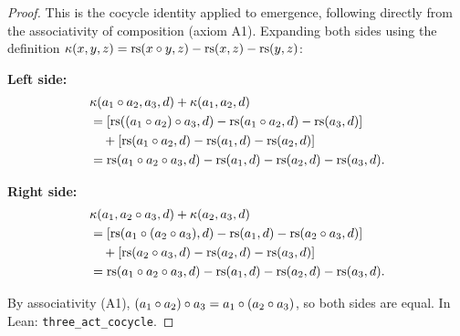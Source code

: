 \begin{proof}
This is the cocycle identity applied to emergence, following directly from the associativity of composition (axiom A1).  Expanding both sides using the definition $\kappa(x, y, z) = \mathrm{rs}(x \circ y, z) - \mathrm{rs}(x, z) - \mathrm{rs}(y, z)$:

\textbf{Left side:}
\begin{align*}
  &\kappa(a_1 \circ a_2, a_3, d) + \kappa(a_1, a_2, d) \\
  &= [\mathrm{rs}((a_1 \circ a_2) \circ a_3, d) - \mathrm{rs}(a_1 \circ a_2, d) - \mathrm{rs}(a_3, d)] \\
  &\quad + [\mathrm{rs}(a_1 \circ a_2, d) - \mathrm{rs}(a_1, d) - \mathrm{rs}(a_2, d)] \\
  &= \mathrm{rs}(a_1 \circ a_2 \circ a_3, d) - \mathrm{rs}(a_1, d) - \mathrm{rs}(a_2, d) - \mathrm{rs}(a_3, d).
\end{align*}

\textbf{Right side:}
\begin{align*}
  &\kappa(a_1, a_2 \circ a_3, d) + \kappa(a_2, a_3, d) \\
  &= [\mathrm{rs}(a_1 \circ (a_2 \circ a_3), d) - \mathrm{rs}(a_1, d) - \mathrm{rs}(a_2 \circ a_3, d)] \\
  &\quad + [\mathrm{rs}(a_2 \circ a_3, d) - \mathrm{rs}(a_2, d) - \mathrm{rs}(a_3, d)] \\
  &= \mathrm{rs}(a_1 \circ a_2 \circ a_3, d) - \mathrm{rs}(a_1, d) - \mathrm{rs}(a_2, d) - \mathrm{rs}(a_3, d).
\end{align*}

By associativity (A1), $(a_1 \circ a_2) \circ a_3 = a_1 \circ (a_2 \circ a_3)$, so both sides are equal.  In Lean: \texttt{three\_act\_cocycle}.
\end{proof}

